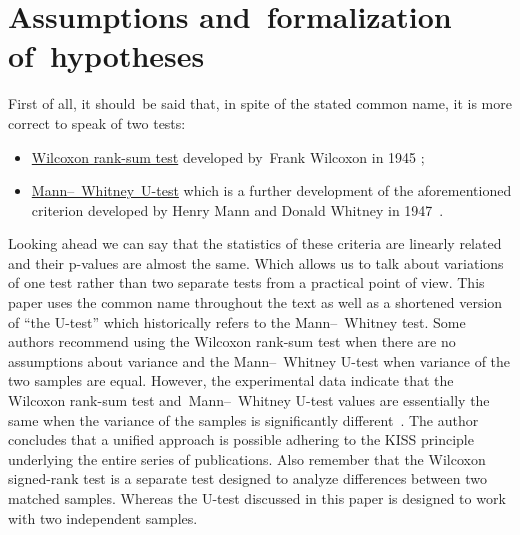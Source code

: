 \documentclass[]{scrreprt}
\begin{document}
\section{Assumptions and~formalization of~hypotheses}
First of all, it should~be said that, in spite of the stated common name, it is more correct to speak of two tests:
\begin{itemize}
	\item \href{http://www.machinelearning.ru/wiki/index.php?title=Критерий_Уилкоксона_двухвыборочный}{Wilcoxon rank-sum test} developed by~Frank Wilcoxon in 1945 \cite{MLRU:Wilcoxon-test};
	\item \href{http://www.machinelearning.ru/wiki/index.php?title=Критерий_Уилкоксона-Манна"--~Уитни}{Mann--~Whitney~U-test} which is a further development of the aforementioned criterion developed by Henry Mann and Donald Whitney in 1947~\cite{MLRU:Mann-Whitney}.
\end{itemize}
Looking ahead we can say that the statistics of these criteria are linearly related and their p-values are almost the same. Which allows us to talk about variations of one test rather than two separate tests from a practical point of view. This paper uses the common name throughout the text as well as a shortened version of ``the U-test'' which historically refers to the Mann--~Whitney test. Some authors\cite{Kobzarq-prikl-mathstat} recommend using the Wilcoxon rank-sum test when there are no assumptions about variance and the Mann--~Whitney U-test when variance of the two samples are equal. However, the experimental data indicate that the Wilcoxon rank-sum test and~Mann--~Whitney U-test values are essentially the same when the variance of the samples is significantly different~\cite{MLRU:Mann-Whitney}. The author concludes that a unified approach is possible adhering to the KISS principle~\cite{KISS-principle} underlying the entire series of publications. Also remember that the Wilcoxon signed-rank test is a separate test designed to analyze differences between two matched samples. Whereas the U-test discussed in this paper is designed to work with two independent samples.
\end{document}
